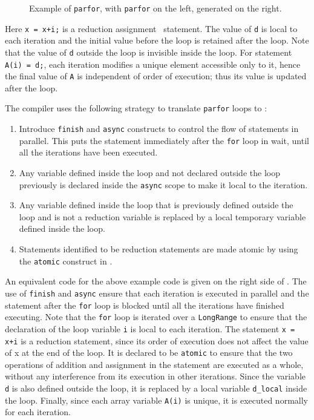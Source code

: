\begin{enumerate}
\begin{figure}[htbp]
\caption{Example of \texttt{parfor}, \matlab with
\texttt{parfor} on the left, generated \xten on the right.}\label{fig:parforex}
\end{figure}

Here \verb|x = x+i;| is a reduction assignment~\cite{reducassg}
statement. The value of \verb|d| is local to each iteration and the
initial value before the loop is retained after the loop. Note that the
value of \verb|d| outside the loop is invisible inside the loop. For
statement \verb|A(i) = d;|, each iteration modifies a unique element
accessible only to it, hence the final value of \verb|A| is independent
of order of execution; thus its value is updated after the loop.  
\end{enumerate}


The \mixten compiler uses the
following strategy to translate \texttt{parfor} loops to \xten:
\begin{enumerate}

\item Introduce \verb|finish| and \verb|async| constructs to control the flow
of statements in parallel. This puts the statement immediately after the
\texttt{for} loop in wait, until all the iterations have been executed.

\item Any variable defined inside the loop and not declared outside the
loop previously is declared inside the \verb|async| scope to
make it local to the iteration.

\item Any variable defined inside the loop that is previously defined
outside the loop and is not a reduction variable is replaced by
a local temporary variable defined inside the loop.

\item Statements identified to be reduction statements are made atomic
by using the \verb|atomic| construct in \xten.

\end{enumerate}

An equivalent \xten code for the above example \matlab code is
given on the right side of . The use of \verb|finish| and
\verb|async| ensure that each iteration is executed in parallel and the
statement after the \verb|for| loop is blocked until all the iterations have
finished executing. Note that the \verb|for| loop is iterated over a
\verb|LongRange| to ensure that the declaration of the loop variable \verb|i| is
local to each iteration. The statement \texttt{x = x+i} is a reduction
statement, since its order of execution does not affect the value of x at the
end of the loop. It is declared to be \verb|atomic| to ensure that the two
operations of addition and assignment in the statement are executed as a whole,
without any interference from its execution in other iterations. Since the
variable \verb|d| is also defined outside the loop, it is replaced by a local
variable \verb|d_local| inside the loop. Finally, since each array variable
\verb|A(i)| is unique, it is executed normally for each iteration.

